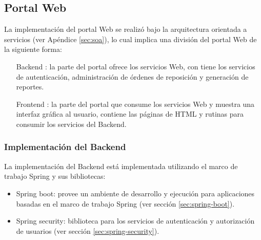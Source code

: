 \subsection{Portal Web}\label{sec:web-portal}
La implementación del portal Web se realizó bajo la arquitectura orientada a servicios (ver Apéndice \ref{sec:soa}), lo cual implica una división del portal Web de la siguiente forma:
\begin{itemize}
	\item [Backend]: la parte del portal ofrece los servicios Web, con tiene los servicios de autenticación, administración de órdenes de reposición y generación de reportes.
	\item [Frontend]: la parte del portal que consume los servicios Web y muestra una interfaz gráfica al usuario, contiene las páginas de HTML y rutinas para consumir los servicios del Backend.
\end{itemize}

\subsubsection{Implementación del Backend}\label{sec:backend}
La implementación del Backend está implementada utilizando el marco de trabajo Spring y sus bibliotecas:
\begin{itemize}
 	\item Spring boot: provee un ambiente de desarrollo y ejecución para aplicaciones basadas en el marco de trabajo Spring (ver sección \ref{sec:spring-boot}). 
 	\item Spring security: biblioteca para los servicios de autenticación y autorización de usuarios (ver sección \ref{sec:spring-security}).
\end{itemize}

